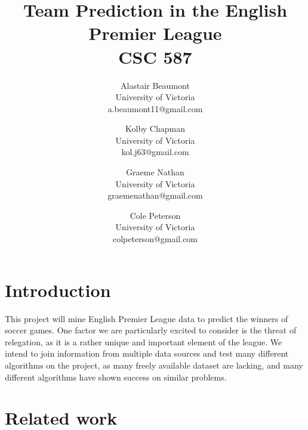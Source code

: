 \documentclass[conference]{IEEEtran}
\begin{document}
%

\title{Team Prediction in the English Premier League\\ {\large CSC 587}}

\author{%
  Alastair Beaumont\\University of Victoria\\a.beaumont11@gmail.com
  \and Kolby Chapman\\University of Victoria\\kol.j63@gmail.com
  \and Graeme Nathan\\University of Victoria\\graemenathan@gmail.com
  \and Cole Peterson\\University of Victoria\\colpeterson@gmail.com
}

\maketitle
\IEEEpeerreviewmaketitle



\section{Introduction}
This project will mine English Premier League data to predict the winners of soccer games. One factor we are particularly excited to consider is the threat of relegation, as it is a rather unique and important element of the league. We intend to join information from multiple data sources and test many different algorithms on the project, as many freely available dataset are lacking, and many different algorithms have shown success on similar problems.

\section{Related work}
\end{document}
